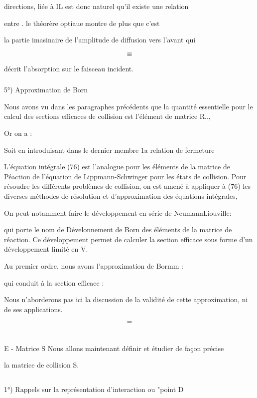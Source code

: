 {{{directions, liée à  IL est donc naturel qu'il existe une relation

entre . le théorère optiaue montre de plus que c'est

la partie imasinaire de l'amplitude de diffusion vers l'avant  qui

\[
\tag{71}=
\]
\[
\tag{78}=
\]


décrit l'absorption sur le faisceau incident.

\subsubsection{}%
5°) Approximation de Born

Nous avons vu dans les paragraphes précédents que la quantité
essentielle pour le calcul des sections efficaces de collision est l'élément de
matrice R..,

Or on a :

Soit en introduisant dans le dernier membre 1a relation de fermeture

L'équation intégrale (76) est l'analogue pour les éléments de la matrice
de Péaction de l'équation de Lippmann-Schwinger pour les états de collision.
Pour résoudre les différents problèmes de collision, on est amené à appliquer à
(76) les diverses méthodes de résolution et d'approximation des
équations intégrales,

On peut notamment faire le développement en série de NeumannLiouville:

qui porte le nom de Dévelonnement de Born des éléments de la matrice de
réaction. Ce développement permet de calculer la section efficace sous
forme d'un développement limité en V.

Au premier ordre, nous avons l'approximation de Bormm : 

qui conduit à la section efficace :

Nous n'aborderons pas ici la discussion de la validité de cette approximation,
ni de ses applications.

\[
\tag{80}=
\]


\section{}%
E - Matrice S
Nous allons maintenant définir et étudier de façon précise

la matrice de collision S.

\subsection{}%
1°) Rappels sur la représentation d'interaction ou "point
D

}}}
